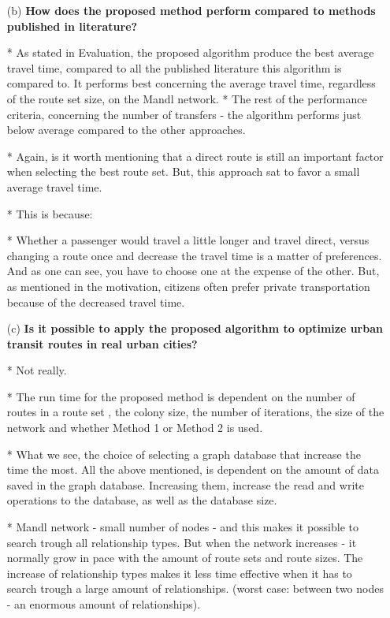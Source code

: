 \begin{enumerate}[label=\textbf{\arabic*})]
\begin{enumerate}
    \item[(b)]  \textbf{How does the proposed method perform compared to methods published in literature?}

    * As stated in Evaluation, the proposed algorithm produce the best average travel time, compared to all the published literature this algorithm is compared to. It performs best concerning the average travel time, regardless of the route set size, on the Mandl network. 
    * The rest of the performance criteria, concerning the number of transfers - the algorithm performs just below average compared to the other approaches. 

    * Again, is it worth mentioning that a direct route is still an important factor when selecting the best route set. But, this approach sat to favor a small average travel time.

    * This is because:

    * Whether a passenger would travel a little longer and travel direct, versus changing a route once and decrease the travel time is a matter of preferences. And as one can see, you have to choose one at the expense of the other. But, as mentioned in the motivation, citizens often prefer private transportation because of the decreased travel time. 

    \item[(c)]  \textbf{Is it possible to apply the proposed algorithm to optimize urban transit routes in real urban cities?}

    * Not really.

    * The run time for the proposed method is dependent on the number of routes in a route set , the colony size, the number of iterations, the size of the network and whether Method 1 or Method 2 is used. 

    * What we see, the choice of selecting a graph database that increase the time the most. All the above mentioned, is dependent on the amount of data saved in the graph database. Increasing them, increase the read and write operations to the database, as well as the database size.

    * Mandl network - small number of nodes - and this makes it possible to search trough all relationship types. But when the network increases - it normally grow in pace with the amount of route sets and route sizes.
    The increase of relationship types makes it less time effective when it has to search trough a large amount of relationships.  (worst case: between two nodes - an enormous amount of relationships).


\end{enumerate}
\end{enumerate}
